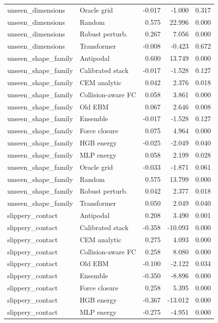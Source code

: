 {\begin{longtable}{llrrr}
unseen\_dimensions & Oracle grid & -0.017 & -1.000 & 0.317 \\
unseen\_dimensions & Random & 0.575 & 22.996 & 0.000 \\
unseen\_dimensions & Robust perturb. & 0.267 & 7.056 & 0.000 \\
unseen\_dimensions & Transformer & -0.008 & -0.423 & 0.672 \\
unseen\_shape\_family & Antipodal & 0.600 & 13.749 & 0.000 \\
unseen\_shape\_family & Calibrated stack & -0.017 & -1.528 & 0.127 \\
unseen\_shape\_family & CEM analytic & 0.042 & 2.376 & 0.018 \\
unseen\_shape\_family & Collision-aware FC & 0.058 & 3.861 & 0.000 \\
unseen\_shape\_family & Old EBM & 0.067 & 2.646 & 0.008 \\
unseen\_shape\_family & Ensemble & -0.017 & -1.528 & 0.127 \\
unseen\_shape\_family & Force closure & 0.075 & 4.964 & 0.000 \\
unseen\_shape\_family & HGB energy & -0.025 & -2.049 & 0.040 \\
unseen\_shape\_family & MLP energy & 0.058 & 2.199 & 0.028 \\
unseen\_shape\_family & Oracle grid & -0.033 & -1.871 & 0.061 \\
unseen\_shape\_family & Random & 0.575 & 13.799 & 0.000 \\
unseen\_shape\_family & Robust perturb. & 0.042 & 2.377 & 0.018 \\
unseen\_shape\_family & Transformer & 0.050 & 2.049 & 0.040 \\
slippery\_contact & Antipodal & 0.208 & 3.490 & 0.001 \\
slippery\_contact & Calibrated stack & -0.358 & -10.093 & 0.000 \\
slippery\_contact & CEM analytic & 0.275 & 4.093 & 0.000 \\
slippery\_contact & Collision-aware FC & 0.258 & 8.080 & 0.000 \\
slippery\_contact & Old EBM & -0.100 & -2.122 & 0.034 \\
slippery\_contact & Ensemble & -0.350 & -8.896 & 0.000 \\
slippery\_contact & Force closure & 0.258 & 5.395 & 0.000 \\
slippery\_contact & HGB energy & -0.367 & -13.012 & 0.000 \\
slippery\_contact & MLP energy & -0.275 & -4.951 & 0.000 \\

\end{longtable}}
